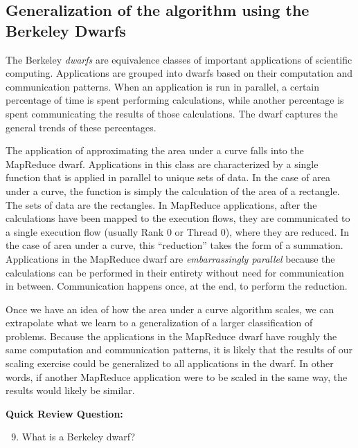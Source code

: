 \documentclass[a4paper, 11pt]{article}
\begin{document}

\subsection{Generalization of the algorithm using the Berkeley Dwarfs}

The Berkeley \emph{dwarfs} are equivalence classes of important applications of scientific computing.  Applications are grouped into dwarfs based on their computation and communication patterns.  When an application is run in parallel, a certain percentage of time is spent performing calculations, while another percentage is spent communicating the results of those calculations.  The dwarf captures the general trends of these percentages.

The application of approximating the area under a curve falls into the MapReduce dwarf.  Applications in this class are characterized by a single function that is applied in parallel to unique sets of data.  In the case of area under a curve, the function is simply the calculation of the area of a rectangle.  The sets of data are the rectangles.  In MapReduce applications, after the calculations have been mapped to the execution flows, they are communicated to a single execution flow (usually Rank 0 or Thread 0), where they are reduced. In the case of area under a curve, this ``reduction'' takes the form of a summation.  Applications in the MapReduce dwarf are \emph{embarrassingly parallel} because the calculations can be performed in their entirety without need for communication in between.  Communication happens once, at the end, to perform the reduction.

Once we have an idea of how the area under a curve algorithm scales, we can extrapolate what we learn to a generalization of a larger classification of problems. Because the applications in the MapReduce dwarf have roughly the same computation and communication patterns, it is likely that the results of our scaling exercise could be generalized to all applications in the dwarf.  In other words, if another MapReduce application were to be scaled in the same way, the results would likely be similar.

\bigskip
\textbf{Quick Review Question:}

\begin{enumerate}
\setcounter{enumi}{8}
\item What is a Berkeley dwarf?
\end{enumerate}
\end{document}

